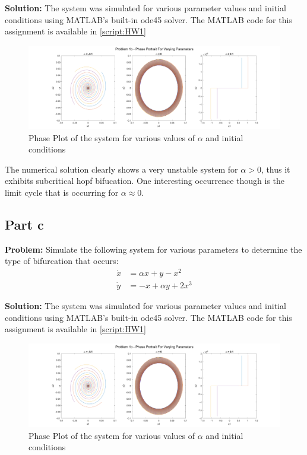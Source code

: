 \documentclass[letter]{article}
\begin{document}
\noindent
\textbf{Solution:}
The system was simulated for various parameter values and initial conditions using MATLAB's built-in ode45 solver. The MATLAB code for this assignment is available in \appendixname \ref{script:HW1}\\

\begin{figure}[h]
	\centering
	\includegraphics[width=1\linewidth]{fig/pblm1b}
	\caption{Phase Plot of the system for various values of $\alpha$ and initial conditions}
	\label{fig:pblm1b}
\end{figure}

The numerical solution clearly shows a very unstable system for $\alpha > 0$, thus it exhibits subcritical hopf bifucation. One interesting occurrence though is the limit cycle that is occurring for $\alpha \approx 0$.

\newpage
\subsection{Part c}
\textbf{Problem:}
Simulate the following system for various parameters to determine the type of bifurcation that occurs:
\begin{equation}
	\begin{aligned}
		\dot{x} &= \alpha x + y - x^2\\
		\dot{y} &= -x + \alpha y + 2 x^3
	\end{aligned}
\end{equation}

\noindent
\textbf{Solution:}
The system was simulated for various parameter values and initial conditions using MATLAB's built-in ode45 solver. The MATLAB code for this assignment is available in \appendixname \ref{script:HW1}\\

\begin{figure}[h]
	\centering
	\includegraphics[width=1\linewidth]{fig/pblm1b}
	\caption{Phase Plot of the system for various values of $\alpha$ and initial conditions}
	\label{fig:pblm1c}
\end{figure}
\end{document}
